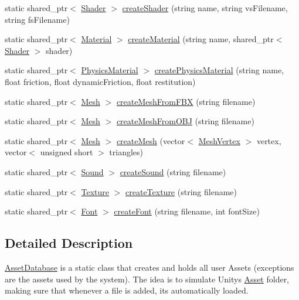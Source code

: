 \begin{DoxyCompactItemize}
\item 
static shared\+\_\+ptr$<$ \hyperlink{class_shader}{Shader} $>$ \hyperlink{class_asset_database_a472ae1d457b43252efd740299f515fa5}{create\+Shader} (string name, string vs\+Filename, string fs\+Filename)
\item 
static shared\+\_\+ptr$<$ \hyperlink{class_material}{Material} $>$ \hyperlink{class_asset_database_a21fb8c80540611ed1a8fb32b273c8177}{create\+Material} (string name, shared\+\_\+ptr$<$ \hyperlink{class_shader}{Shader} $>$ shader)
\item 
static shared\+\_\+ptr$<$ \hyperlink{class_physics_material}{Physics\+Material} $>$ \hyperlink{class_asset_database_ad724e4ceb50db68af5a6d13b1359b112}{create\+Physics\+Material} (string name, float friction, float dynamic\+Friction, float restitution)
\item 
static shared\+\_\+ptr$<$ \hyperlink{class_mesh}{Mesh} $>$ \hyperlink{class_asset_database_ab5793b0cd769426e4fb31626cc863850}{create\+Mesh\+From\+F\+B\+X} (string filename)
\item 
static shared\+\_\+ptr$<$ \hyperlink{class_mesh}{Mesh} $>$ \hyperlink{class_asset_database_adb9836fa33d82c3b58a2133cc072e2d2}{create\+Mesh\+From\+O\+B\+J} (string filename)
\item 
static shared\+\_\+ptr$<$ \hyperlink{class_mesh}{Mesh} $>$ \hyperlink{class_asset_database_a5228eaa4dbb587dd1d4c7ae4e69402da}{create\+Mesh} (vector$<$ \hyperlink{struct_mesh_vertex}{Mesh\+Vertex} $>$ vertex, vector$<$ unsigned short $>$ triangles)
\item 
static shared\+\_\+ptr$<$ \hyperlink{class_sound}{Sound} $>$ \hyperlink{class_asset_database_aab4df6c6999d752fce7a222c1f79f224}{create\+Sound} (string filename)
\item 
static shared\+\_\+ptr$<$ \hyperlink{class_texture}{Texture} $>$ \hyperlink{class_asset_database_a85240fb09c76bf851d4bb10bd0cfc77a}{create\+Texture} (string filename)
\item 
static shared\+\_\+ptr$<$ \hyperlink{class_font}{Font} $>$ \hyperlink{class_asset_database_ae558252480890d40daefc38b7e8d3d7a}{create\+Font} (string filename, int font\+Size)
\end{DoxyCompactItemize}


\subsection{Detailed Description}
\hyperlink{class_asset_database}{Asset\+Database} is a static class that creates and holds all user Assets (exceptions are the assets used by the system). The idea is to simulate Unity\textquotesingle{}s \hyperlink{class_asset}{Asset} folder, making sure that whenever a file is added, it\textquotesingle{}s automatically loaded. 

